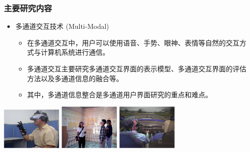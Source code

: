 \documentclass{beamer}
\begin{document}
\begin{frame}
	\frametitle{主要研究内容}
	\begin{itemize}
		\item 多通道交互技术 (Multi-Modal)
		\begin{itemize}
			\item 在多通道交互中，用户可以使用语音、手势、眼神、表情等自然的交互方式与计算机系统进行通信。
			\item 多通道交互主要研究多通道交互界面的表示模型、多通道交互界面的评估方法以及多通道信息的融合等。
			\item 其中，多通道信息整合是多通道用户界面研究的重点和难点。
		\end{itemize}
	\end{itemize}
	\begin{center}
		\includegraphics[width=3cm]{images/multimodal1.jpg}
		\includegraphics[width=3cm]{images/multimodal2.jpg}
		\includegraphics[width=3cm]{images/multimodal3.jpg}
	\end{center}
\end{frame}
\end{document}
